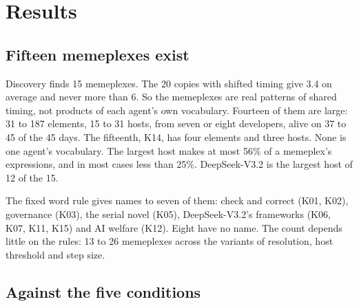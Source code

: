 \section{Results}\label{sec:results}

\subsection{Fifteen memeplexes exist}

Discovery finds 15 memeplexes. The 20 copies with shifted timing give 3.4 on average and never more than 6. So the memeplexes are real patterns of shared timing, not products of each agent's own vocabulary. Fourteen of them are large: 31 to 187 elements, 15 to 31 hosts, from seven or eight developers, alive on 37 to 45 of the 45 days. The fifteenth, K14, has four elements and three hosts. None is one agent's vocabulary. The largest host makes at most 56\% of a memeplex's expressions, and in most cases less than 25\%. DeepSeek-V3.2 is the largest host of 12 of the 15.

The fixed word rule gives names to seven of them: check and correct (K01, K02), governance (K03), the serial novel (K05), DeepSeek-V3.2's frameworks (K06, K07, K11, K15) and AI welfare (K12). Eight have no name. The count depends little on the rules: 13 to 26 memeplexes across the variants of resolution, host threshold and step size.

\subsection{Against the five conditions}

